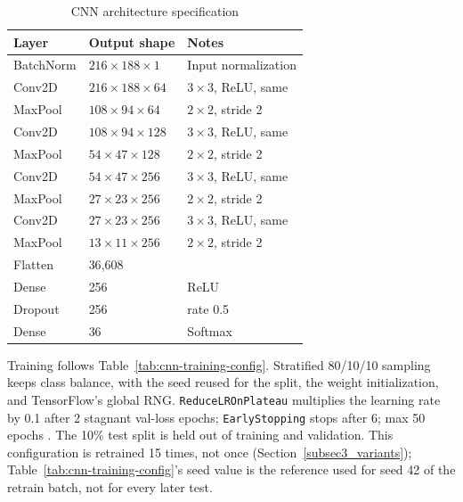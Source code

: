 \documentclass[pdflatex,sn-mathphys-num,iicol]{sn-jnl}
\theoremstyle{thmstyleone}
\theoremstyle{thmstyletwo}
\theoremstyle{thmstylethree}
\begin{document}
\begin{table}[t]
\caption{CNN architecture specification}\label{tab:cnn-architecture}
\begin{tabularx}{\columnwidth}{@{}lXl@{}}
\toprule
Layer & Output shape & Notes \\
\midrule
BatchNorm & $216{\times}188{\times}1$ & Input normalization \\
Conv2D & $216{\times}188{\times}64$ & $3{\times}3$, ReLU, same \\
MaxPool & $108{\times}94{\times}64$ & $2{\times}2$, stride 2 \\
Conv2D & $108{\times}94{\times}128$ & $3{\times}3$, ReLU, same \\
MaxPool & $54{\times}47{\times}128$ & $2{\times}2$, stride 2 \\
Conv2D & $54{\times}47{\times}256$ & $3{\times}3$, ReLU, same \\
MaxPool & $27{\times}23{\times}256$ & $2{\times}2$, stride 2 \\
Conv2D & $27{\times}23{\times}256$ & $3{\times}3$, ReLU, same \\
MaxPool & $13{\times}11{\times}256$ & $2{\times}2$, stride 2 \\
Flatten & 36{,}608 & \\
Dense & 256 & ReLU \\
Dropout & 256 & rate 0.5 \\
Dense & 36 & Softmax \\
\bottomrule
\end{tabularx}
\end{table}

Training follows Table~\ref{tab:cnn-training-config}. Stratified 80/10/10 sampling keeps class balance, with the seed reused for the split, the weight initialization, and TensorFlow's global RNG. \texttt{ReduceLROnPlateau} multiplies the learning rate by 0.1 after 2 stagnant val-loss epochs; \texttt{EarlyStopping} stops after 6; max 50 epochs \cite{Wolf-Monheim2025}. The 10\% test split is held out of training and validation. This configuration is retrained 15 times, not once (Section~\ref{subsec3_variants}); Table~\ref{tab:cnn-training-config}'s seed value is the reference used for seed 42 of the retrain batch, not for every later test.
\end{document}
